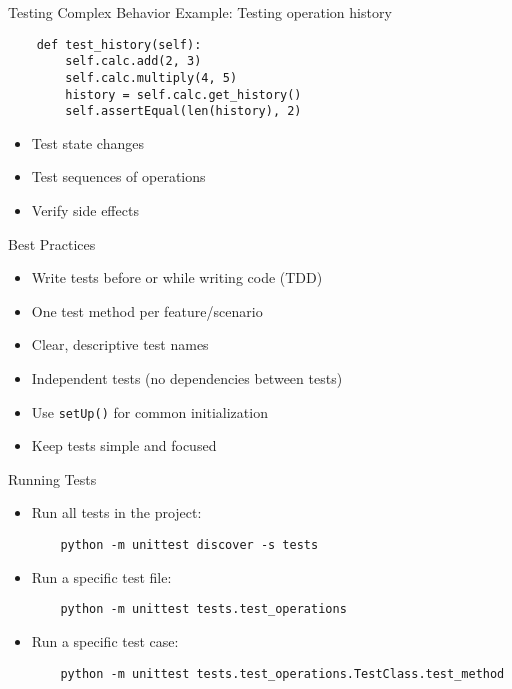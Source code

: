 \documentclass[aspectratio=169]{beamer}
\begin{document}
\begin{frame}[fragile]{Testing Complex Behavior}
    Example: Testing operation history
    \begin{verbatim}
    def test_history(self):
        self.calc.add(2, 3)
        self.calc.multiply(4, 5)
        history = self.calc.get_history()
        self.assertEqual(len(history), 2)
    \end{verbatim}
    \begin{itemize}
        \item Test state changes
        \item Test sequences of operations
        \item Verify side effects
    \end{itemize}
\end{frame}

\begin{frame}{Best Practices}
    \begin{itemize}
        \item Write tests before or while writing code (TDD)
        \item One test method per feature/scenario
        \item Clear, descriptive test names
        \item Independent tests (no dependencies between tests)
        \item Use \texttt{setUp()} for common initialization
        \item Keep tests simple and focused
    \end{itemize}
\end{frame}

\begin{frame}[fragile]{Running Tests}
    \begin{itemize}
        \item Run all tests in the project:
        \begin{verbatim}
    python -m unittest discover -s tests
        \end{verbatim}
        \item Run a specific test file:
        \begin{verbatim}
    python -m unittest tests.test_operations
        \end{verbatim}
        \item Run a specific test case:
        \begin{verbatim}
    python -m unittest tests.test_operations.TestClass.test_method
        \end{verbatim}
    \end{itemize}
\end{frame}
\end{document}
